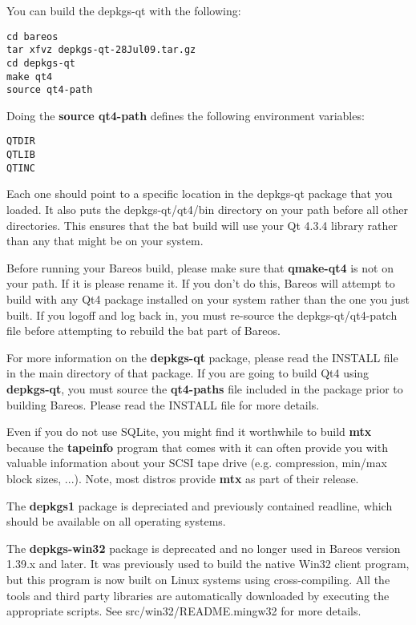 You can build the depkgs-qt with the following:

\footnotesize
\begin{verbatim}
cd bareos
tar xfvz depkgs-qt-28Jul09.tar.gz
cd depkgs-qt
make qt4
source qt4-path
\end{verbatim}
\normalsize

Doing the {\bf source qt4-path} defines the following environment
variables:

\footnotesize
\begin{verbatim}
QTDIR
QTLIB
QTINC
\end{verbatim}
\normalsize

Each one should point to a specific location in the depkgs-qt package
that you loaded.  It also puts the depkgs-qt/qt4/bin directory
on your path before all other directories.  This ensures that
the bat build will use your Qt 4.3.4 library rather than any that
might be on your system.

Before running your Bareos build, please make sure that
{\bf qmake-qt4} is not on your path.  If it is please rename it. If
you don't do this, Bareos will attempt to build with any Qt4 package
installed on your system rather than the one you just built.
If you logoff and log back in, you must re-source the depkgs-qt/qt4-patch
file before attempting to rebuild the bat part of Bareos.

For more information on the {\bf depkgs-qt} package, please read the
INSTALL file in the main directory of that package. If you are going to
build Qt4 using {\bf depkgs-qt}, you must source the {\bf qt4-paths} file
included in the package prior to building Bareos. Please read the INSTALL
file for more details.

Even if you do not use SQLite, you might find it worthwhile to build {\bf mtx}
because the {\bf tapeinfo} program that comes with it can often provide you
with valuable information about your SCSI tape drive (e.g. compression,
min/max block sizes, ...). Note, most distros provide {\bf mtx} as part of
their release.

The {\bf depkgs1} package is depreciated and previously contained
readline, which should be available on all operating systems.

The {\bf depkgs-win32} package is deprecated and no longer used in
Bareos version 1.39.x and later. It was previously used to build
the native Win32 client program, but this program is now built on Linux
systems using cross-compiling.  All the tools and third party libraries
are automatically downloaded by executing the appropriate scripts.  See
src/win32/README.mingw32 for more details.


